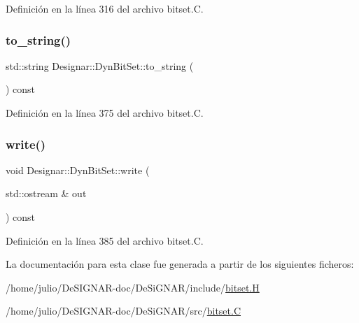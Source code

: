 Definición en la línea 316 del archivo bitset.\+C.

\mbox{\label{class_designar_1_1_dyn_bit_set_ad393d0c9a7f15f022b0529fbe2983780}} 
\subsubsection{\texorpdfstring{to\+\_\+string()}{to\_string()}}
{\footnotesize\ttfamily std\+::string Designar\+::\+Dyn\+Bit\+Set\+::to\+\_\+string (\begin{DoxyParamCaption}{ }\end{DoxyParamCaption}) const}



Definición en la línea 375 del archivo bitset.\+C.

\mbox{\label{class_designar_1_1_dyn_bit_set_ac04df606a53e544d8e87d931be0abac0}} 
\subsubsection{\texorpdfstring{write()}{write()}}
{\footnotesize\ttfamily void Designar\+::\+Dyn\+Bit\+Set\+::write (\begin{DoxyParamCaption}\item[{std\+::ostream \&}]{out }\end{DoxyParamCaption}) const}



Definición en la línea 385 del archivo bitset.\+C.



La documentación para esta clase fue generada a partir de los siguientes ficheros\+:\begin{DoxyCompactItemize}
\item 
/home/julio/\+De\+S\+I\+G\+N\+A\+R-\/doc/\+De\+Si\+G\+N\+A\+R/include/\hyperlink{bitset_8_h}{bitset.\+H}\item 
/home/julio/\+De\+S\+I\+G\+N\+A\+R-\/doc/\+De\+Si\+G\+N\+A\+R/src/\hyperlink{bitset_8_c}{bitset.\+C}\end{DoxyCompactItemize}
